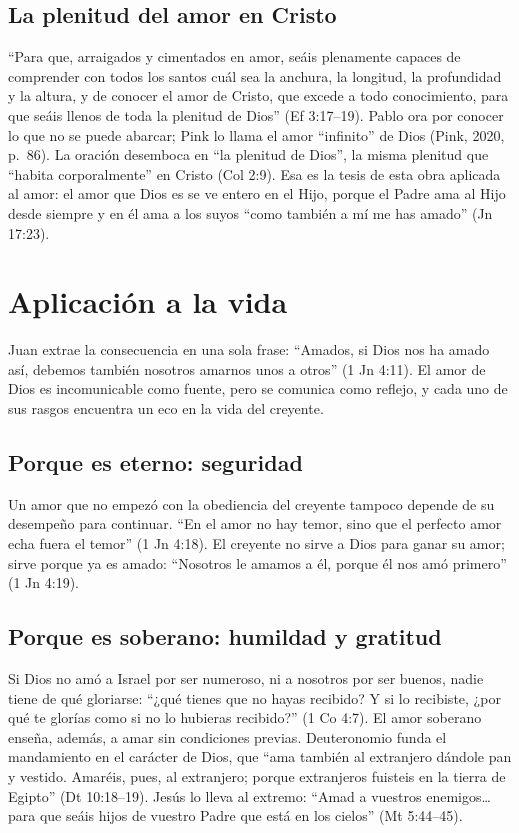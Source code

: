 \subsection{La plenitud del amor en Cristo}
``Para que, arraigados y cimentados en amor, seáis plenamente capaces de comprender con todos los santos cuál sea la anchura, la longitud, la profundidad y la altura, y de conocer el amor de Cristo, que excede a todo conocimiento, para que seáis llenos de toda la plenitud de Dios'' (Ef 3:17--19). Pablo ora por conocer lo que no se puede abarcar; Pink lo llama el amor ``infinito'' de Dios (Pink, 2020, p.~86). La oración desemboca en ``la plenitud de Dios'', la misma plenitud que ``habita corporalmente'' en Cristo (Col 2:9). Esa es la tesis de esta obra aplicada al amor: el amor que Dios es se ve entero en el Hijo, porque el Padre ama al Hijo desde siempre y en él ama a los suyos ``como también a mí me has amado'' (Jn 17:23).

\section{Aplicación a la vida}

Juan extrae la consecuencia en una sola frase: ``Amados, si Dios nos ha amado así, debemos también nosotros amarnos unos a otros'' (1 Jn 4:11). El amor de Dios es incomunicable como fuente, pero se comunica como reflejo, y cada uno de sus rasgos encuentra un eco en la vida del creyente.

\subsection{Porque es eterno: seguridad}
Un amor que no empezó con la obediencia del creyente tampoco depende de su desempeño para continuar. ``En el amor no hay temor, sino que el perfecto amor echa fuera el temor'' (1 Jn 4:18). El creyente no sirve a Dios para ganar su amor; sirve porque ya es amado: ``Nosotros le amamos a él, porque él nos amó primero'' (1 Jn 4:19).

\subsection{Porque es soberano: humildad y gratitud}
Si Dios no amó a Israel por ser numeroso, ni a nosotros por ser buenos, nadie tiene de qué gloriarse: ``¿qué tienes que no hayas recibido? Y si lo recibiste, ¿por qué te glorías como si no lo hubieras recibido?'' (1 Co 4:7). El amor soberano enseña, además, a amar sin condiciones previas. Deuteronomio funda el mandamiento en el carácter de Dios, que ``ama también al extranjero dándole pan y vestido. Amaréis, pues, al extranjero; porque extranjeros fuisteis en la tierra de Egipto'' (Dt 10:18--19). Jesús lo lleva al extremo: ``Amad a vuestros enemigos\ldots{} para que seáis hijos de vuestro Padre que está en los cielos'' (Mt 5:44--45).

